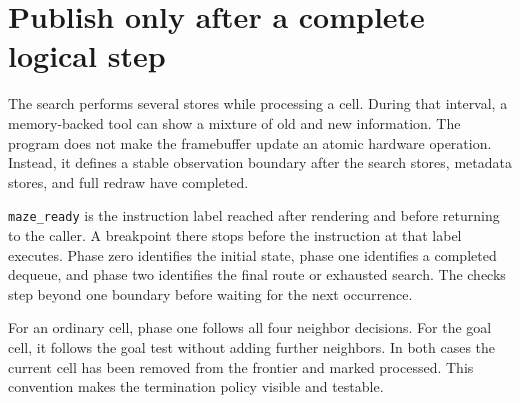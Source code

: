 \section{Publish only after a complete logical step}\label{maze-p08}

The search performs several stores while processing a cell. During that interval, a memory-backed tool can show a mixture of old and new information. The program does not make the framebuffer update an atomic hardware operation. Instead, it defines a stable observation boundary after the search stores, metadata stores, and full redraw have completed.

\texttt{maze\_ready} is the instruction label reached after rendering and before returning to the caller. A breakpoint there stops before the instruction at that label executes. Phase zero identifies the initial state, phase one identifies a completed dequeue, and phase two identifies the final route or exhausted search. The checks step beyond one boundary before waiting for the next occurrence.

For an ordinary cell, phase one follows all four neighbor decisions. For the goal cell, it follows the goal test without adding further neighbors. In both cases the current cell has been removed from the frontier and marked processed. This convention makes the termination policy visible and testable.
